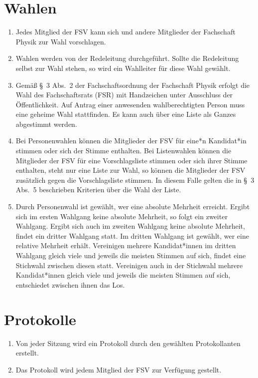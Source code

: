 \documentclass[
	a4paper,
	12pt,
	oneside,
	parskip=half-,
	pagesize,
	headsepline,
	german,
	ngerman
]{scrartcl}
\begin{document}
\section{Wahlen}
\begin{enumerate}
	\item Jedes Mitglied der FSV kann sich und andere Mitglieder der Fachschaft Physik zur Wahl vorschlagen.
	\item Wahlen werden von der Redeleitung durchgeführt. Sollte die Redeleitung selbst zur Wahl stehen, so wird ein Wahlleiter für diese Wahl gewählt.
	\item Gemäß §~3 Abs.~2 der Fachschaftsordnung der Fachschaft Physik erfolgt die Wahl des Fachschaftsrats (FSR) mit Handzeichen unter Ausschluss der Öffentlichkeit. Auf Antrag einer anwesenden wahlberechtigten Person muss eine geheime Wahl stattfinden. Es kann auch über eine Liste als Ganzes abgestimmt werden. 
	\item Bei Personenwahlen können die Mitglieder der FSV für eine*n Kandidat*in stimmen oder sich der Stimme enthalten. Bei Listenwahlen können die Mitglieder der FSV für eine Vorschlagsliste stimmen oder sich ihrer Stimme enthalten, steht nur eine Liste zur Wahl, so können die Mitglieder der FSV zusätzlich gegen die Vorschlagsliste stimmen. In diesem Falle gelten die in §~3 Abs.~5 beschrieben Kriterien über die Wahl der Liste. 
	\item Durch Personenwahl ist gewählt, wer eine absolute Mehrheit erreicht. Ergibt sich im ersten Wahlgang keine absolute Mehrheit, so folgt ein zweiter Wahlgang. Ergibt sich auch im zweiten Wahlgang keine absolute Mehrheit, findet ein dritter Wahlgang statt. Im dritten Wahlgang ist gewählt, wer eine relative Mehrheit erhält. Vereinigen mehrere Kandidat*innen im dritten Wahlgang gleich viele und jeweils die meisten Stimmen auf sich, findet eine Stichwahl zwischen diesen statt. Vereinigen auch in der Stichwahl mehrere Kandidat*innen gleich viele und jeweils die meisten Stimmen auf sich, entschiedet zwischen ihnen das Los. 
\end{enumerate}

\section{Protokolle}
\begin{enumerate}
	\item Von jeder Sitzung wird ein Protokoll durch den gewählten Protokollanten erstellt.
	\item Das Protokoll wird jedem Mitglied der FSV  zur Verfügung gestellt. 
\end{enumerate}
\end{document}
